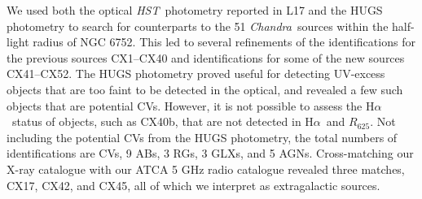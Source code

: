 \documentclass[fleqn,usenatbib]{mnras}
\newcommand{\hst}{\emph{HST}}
\newcommand{\chandra}{\emph{Chandra}}
\newcommand{\R}{\mbox{$R_{625}$}}
\newcommand{\ha}{\mbox{H$\alpha$}}
\newcommand{\revised}[1]{{\color{black}{#1}}}
\begin{document}
We used both the optical \hst\ photometry reported in L17 and the HUGS photometry \citep{Piotto15,Nardiello18} to search for counterparts to the 51 \chandra\ sources within the half-light radius of NGC 6752. This led to several refinements of the identifications for the previous sources CX1--CX40 and identifications for some of the new sources CX41--CX52. The HUGS photometry proved useful for detecting UV-excess objects that are too faint to be detected in the optical, and revealed a few such objects that are potential CVs. However, it is not possible to assess the \ha\ status of objects, such as CX40b, that are not detected in \ha\ and \R. Not including the potential CVs from the HUGS photometry, the total numbers of identifications are \revised{18} CVs, 9 ABs, 3 RGs, 3 GLXs, and 5 AGNs. \revised{In addition, 3 of the sources are associated with MSPs.}  
Cross-matching our X-ray catalogue with our ATCA 5 GHz radio catalogue revealed three matches, CX17, CX42, and CX45, all of which we interpret as extragalactic sources. %
 
\end{document}

